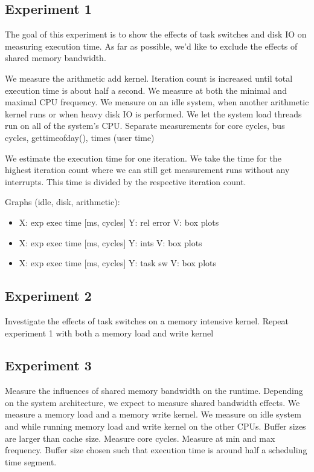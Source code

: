 \documentclass[a4paper,12pt]{article}
\begin{document}
\subsection{Experiment 1}
The goal of this experiment is to show the effects of task switches and disk IO
on measuring execution time. As far as possible, we'd like to exclude the
effects of shared memory bandwidth. 

We measure the arithmetic add kernel. Iteration count is increased until total
execution time is about half a second. We measure at both the minimal and
maximal CPU frequency. We measure on an idle system, when another arithmetic
kernel runs or when heavy disk IO is performed. We let the system load threads
run on all of the system's CPU. Separate measurements for core cycles, bus
cycles, gettimeofday(), times (user time)

We estimate the execution time for one iteration. We take the time for the
highest iteration count where we can still get measurement runs without any
interrupts. This time is divided by the respective iteration count.

Graphs (idle, disk, arithmetic): 

\begin{itemize}
\item X: exp exec time [ms, cycles] Y: rel error V: box plots
\item X: exp exec time [ms, cycles] Y: ints V: box plots
\item X: exp exec time [ms, cycles] Y: task sw V: box plots
\end{itemize}

\subsection{Experiment 2}
Investigate the effects of task switches on a memory intensive kernel. Repeat
experiment 1 with both a memory load and write kernel

\subsection{Experiment 3}
Measure the influences of shared memory bandwidth on the runtime. Depending on
the system architecture, we expect to measure shared bandwidth effects. We
measure a memory load and a memory write kernel. We measure on idle system and
while running memory load and write kernel on the other CPUs. Buffer sizes are
larger than cache size. Measure core cycles. Measure at min and max frequency.
Buffer size chosen such that execution time is around half a scheduling time
segment.
\end{document}
